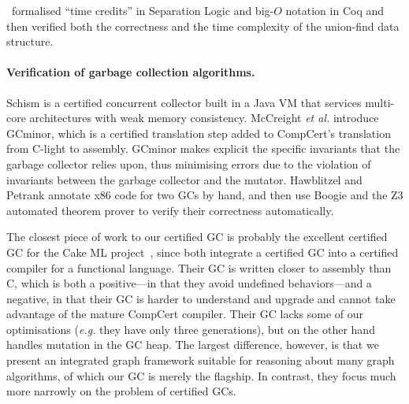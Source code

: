 \cite{gueneauetal}~formalised ``time credits'' in Separation Logic and big-$O$ notation in
Coq and then verified both the correctness
and the time complexity of the union-find data structure.

\paragraph{Verification of garbage collection algorithms.}
Schism \cite{gcexample4,gcexample4a} is a certified concurrent
collector built in a Java VM that services multi-core architectures with weak memory consistency.
McCreight \emph{et al.} \cite{gcexample5, gcexample3} introduce GCminor, which is
a certified translation step added to CompCert's translation from C-light to assembly.
GCminor makes explicit the specific invariants that the garbage collector
relies upon, thus minimising errors due to the violation of invariants
between the garbage collector and the mutator.
Hawblitzel and Petrank \cite{gcexample2} annotate x86 code
for two GCs by hand, and then use Boogie and the Z3 automated theorem prover
to verify their correctness automatically.

The closest piece of work to our certified GC is probably the excellent certified GC
for the Cake ML project~\cite{cakemlgc}, since both integrate a certified GC into 
a certified compiler for a functional language.  Their GC is written closer to assembly 
than C, which is both a positive---in that they avoid undefined behaviors---and a negative, 
in that their GC is harder to understand and upgrade and cannot take advantage of the
mature CompCert compiler.  Their GC lacks some of our optimisations (\emph{e.g.} they have 
only three generations), but on the other hand handles mutation in the GC heap.  The largest 
difference, however, is that we present an integrated graph framework suitable for reasoning 
about many graph algorithms, of which our GC is merely the flagship.  In contrast, they focus 
much more narrowly on the problem of certified GCs.





